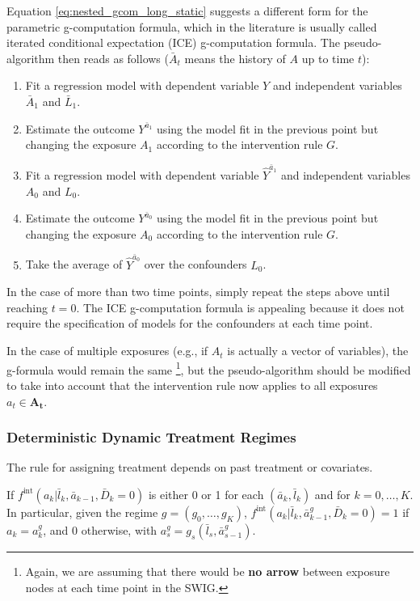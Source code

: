 \documentclass[12pt,twoside]{article}
\begin{document}
Equation \ref{eq:nested_gcom_long_static} suggests a different form for the parametric g-computation formula, which in the literature is usually called iterated conditional expectation (ICE) g-computation formula. The pseudo-algorithm then reads as follows ($\bar{A}_t$ means the history of $A$ up to time $t$):

\begin{enumerate}
    \item Fit a regression model with dependent variable $Y$ and independent variables $\bar{A}_1$ and $\bar{L}_1$.
    \item Estimate the outcome $Y^{\bar{a}_1}$ using the model fit in the previous point but changing the exposure $A_1$ according to the intervention rule $G$.
    \item Fit a regression model with dependent variable $\hat{Y}^{\bar{a}_1}$ and independent variables $A_0$ and $L_0$.
    \item Estimate the outcome $Y^{\bar{a}_0}$ using the model fit in the previous point but changing the exposure $A_0$ according to the intervention rule $G$.
    \item Take the average of $\hat{Y}^{\bar{a}_0}$ over the confounders $L_0$.
\end{enumerate}

In the case of more than two time points, simply repeat the steps above until reaching $t=0$. The ICE g-computation formula is appealing because it does not require the specification of models for the confounders at each time point.

In the case of multiple exposures (e.g., if $A_t$ is actually a vector of variables), the g-formula would remain the same \footnote{Again, we are assuming that there would be \textbf{no arrow} between exposure nodes at each time point in the SWIG.}, but the pseudo-algorithm should be modified to take into account that the intervention rule now applies to all exposures $a_t \in \mathbf{A_t}$.

\subsubsection{Deterministic Dynamic Treatment Regimes}
The rule for assigning treatment depends on past treatment or covariates.

If $f^{\text{int}} (a_k | \bar{l}_k, \bar{a}_{k-1}, \bar{D}_k=0)$ is either 0 or 1 for each $(\bar{a}_k, \bar{l}_k)$ and for $k = 0,\dots,K$. In particular, given the regime $g = (g_0,\dots,g_K)$, $f^{\text{int}} (a_k | \bar{l}_k, \bar{a}_{k-1}^g, \bar{D}_k=0) = 1$ if $a_k = a_k^g$, and 0 otherwise, with $a_s^g = g_s(\bar{l}_s, \bar{a}_{s-1}^g)$.
\end{document}

